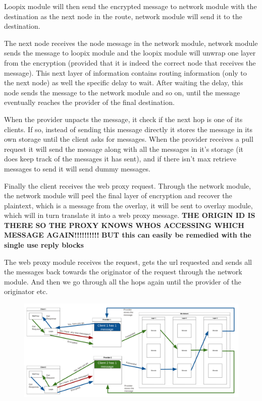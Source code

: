 \documentclass[a4paper,11pt,oneside]{report}
\begin{document}
Loopix module will then send the encrypted message to network module with the destination as the next node in the route, network module will send it to the destination.

The next node receives the node message in the network module, network module sends the message to loopix module and the loopix module will unwrap one layer from the encryption (provided that it is indeed the correct node that receives the message). This next layer of information contains routing information (only to the next node) as well the specific delay to wait. After waiting the delay, this node sends the message to the network module and so on, until the message eventually reaches the provider of the final destination.

When the provider unpacts the message, it check if the next hop is one of its clients. If so, instead of sending this message directly it stores the message in its own storage until the client asks for messages. When the provider receives a pull request it will send the message along with all the messages in it's storage (it does keep track of the messages it has sent), and if there isn't max retrieve messages to send it will send dummy messages.

Finally the client receives the web proxy request. Through the network module, the network module will peel the final layer of encryption and recover the plaintext, which is a message from the overlay, it will be sent to overlay module, which will in turn translate it into a web proxy message.
\textbf{THE ORIGIN ID IS THERE SO THE PROXY KNOWS WHOS ACCESSING WHICH MESSAGE AGAIN!!!!!!!!!!}
\textbf{BUT this can easily be remedied with the single use reply blocks}

The web proxy module receives the request, gets the url requested and sends all the messages back towards the originator of the request through the network module. And then we go through all the hops again until the provider of the originator etc.

\begin{figure}[H]
    \centering
    \includegraphics[width=1\linewidth]{plots/implementation.png}
    \caption{}
    \label{fig:implementation}
\end{figure}
\end{document}
